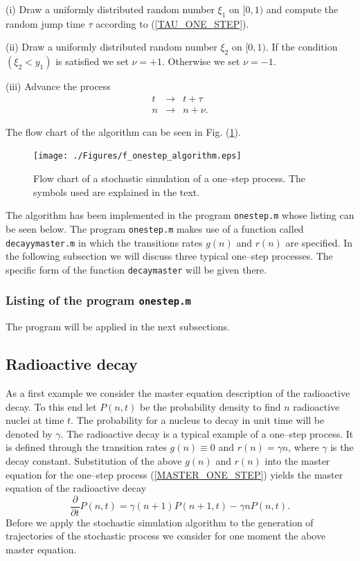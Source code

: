 (i) Draw a uniformly distributed random number $\xi_1$ on $[0,1)$
   and compute the random jump time $\tau$ according to 
   (\ref{TAU_ONE_STEP}). 
   
(ii) Draw a uniformly distributed random number $\xi_2$ on 
$[0,1)$. If the condition $(\xi_2 < y_1)$ is satisfied we set 
$\nu =+1$.  Otherwise we set $\nu =-1$.

(iii) Advance the process
\begin{eqnarray*}
t &\longrightarrow& t+\tau \\
n & \longrightarrow & n + \nu.
\end{eqnarray*}

The flow chart of the algorithm can be seen in Fig. 
(\ref{F_ONESTEP_ALGORITHM}).
\begin{figure}
\label{F_ONESTEP_ALGORITHM}
\texttt{[image: ./Figures/f\_onestep\_algorithm.eps]}
\caption{Flow chart of a stochastic simulation of a 
    one--step process. The symbols used
     are explained in the text.}
\end{figure}
The algorithm has been implemented in the program {\texttt{onestep.m}}
whose listing can be seen below. The program {\texttt{onestep.m}} makes
use of a function called {\texttt{decayymaster.m}} in which the
transitions rates $g(n)$ and $r(n)$ are specified. In the 
following subsection we will discuss three typical one--step 
processes. The specific form of the function \texttt{decaymaster} 
will be given there.

\subsubsection{Listing of the program {\texttt{onestep.m}}}

The program will be applied in the next subsections.


\subsection{Radioactive decay}
As a first example we consider the master equation 
description of the radioactive decay. To this end let
$P(n,t)$ be the probability density to find $n$ radioactive nuclei
at time $t$. The probability for a nucleus to decay in unit time will
be denoted by $\gamma$. The radioactive decay is a typical example
of a one--step process. It is defined through
the transition rates
$g(n) \equiv 0$ and $r(n)= \gamma n$, where $\gamma$ is the decay constant.
Substitution of the above $g(n)$ and $r(n)$ into the master equation
for the one--step process
(\ref{MASTER_ONE_STEP}) yields the master equation of the radioactive 
decay
\begin{equation}
\frac{\partial}{\partial t} P(n,t) = 
\gamma (n+1) P(n+1,t) - \gamma n P(n,t).
\end{equation}
Before we apply the stochastic simulation algorithm to the 
generation of trajectories of the stochastic process we consider
for one moment the above master equation.

